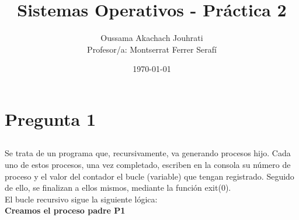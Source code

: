 \documentclass[spanish]{article}
\title{Sistemas Operativos - Práctica 2}
\author{Oussama Akachach Jouhrati\\
[0.5cm]{\small Profesor/a: Montserrat Ferrer Serafí}}
\date{\today}
\begin{document}
\maketitle
\newpage

\tableofcontents
{}
\setcounter{page}{2}

\newpage


\section{Pregunta 1}

\subsection{}

\subsubsection{}

Se trata de un programa que, recursivamente, va generando
procesos hijo. Cada uno de estos procesos, una vez
completado, escriben en la consola su número de proceso y el
valor del contador el bucle (variable) que tengan
registrado. Seguido de ello, se finalizan a ellos mismos,
mediante la función exit(0).\\

El bucle recursivo sigue la siguiente lógica:\\

\textbf{Creamos el proceso padre P1}
\end{document}
